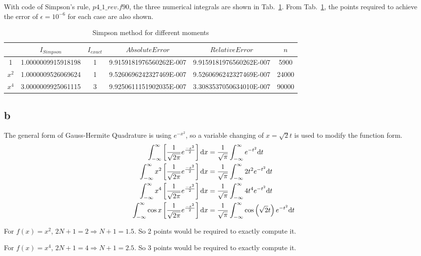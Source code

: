 \documentclass[letterpaper,10pt]{article}
\begin{document}
With code of Simpson's rule, $p4\_1\_{rev}.f90$, the three numerical integrals are shown in Tab.~\ref{tab4_1}. 
From Tab.~\ref{tab4_1}, the points required to achieve the error of $\epsilon=10^{-6}$ for each case are also shown. 
\begin{table}[htbp]
  \centering  
  \caption{Simpson method for different moments}\label{tab4_1}
  \begin{tabular}{cccccc}
    \hline
    & $I_{Simpson}$ & $I_{exact}$ & $Absolute Error$ & $Relative Error$& $n$\\
    \hline
    1 & 1.0000009915918198 & 1 & 9.9159181976560262E-007 & 9.9159181976560262E-007 & 5900\\
    $x^2$ & 1.0000009526069624 & 1 & 9.5260696242327469E-007 & 9.5260696242327469E-007 & 24000\\
    $x^4$ & 3.0000009925061115 & 3 & 9.9250611151902035E-007 & 3.3083537050634010E-007 & 90000\\
    \hline
  \end{tabular}
\end{table}
\subsection{b}
The general form of Gauss-Hermite Quadrature is using $e^{-x^2}$, so a variable changing of $x=\sqrt{2}t$ 
is used to modify the function form. 
\begin{align}
  \int_{-\infty}^{\infty} \left[\frac{1}{\sqrt{2\pi}}e^{\frac{-x^2}{2}}\right]\mathrm{d}x &= \frac{1}{\sqrt{\pi}}\int_{-\infty}^{\infty} e^{-t^2}\mathrm{d}t\notag\\
  \int_{-\infty}^{\infty} x^2\left[\frac{1}{\sqrt{2\pi}}e^{\frac{-x^2}{2}}\right]\mathrm{d}x &= \frac{1}{\sqrt{\pi}}\int_{-\infty}^{\infty} 2t^2 e^{-t^2}\mathrm{d}t\notag\\
  \int_{-\infty}^{\infty} x^4\left[\frac{1}{\sqrt{2\pi}}e^{\frac{-x^2}{2}}\right]\mathrm{d}x &= \frac{1}{\sqrt{\pi}}\int_{-\infty}^{\infty} 4t^4 e^{-t^2}\mathrm{d}t\notag\\
  \int_{-\infty}^{\infty} \cos x \left[\frac{1}{\sqrt{2\pi}}e^{\frac{-x^2}{2}}\right]\mathrm{d}x &= \frac{1}{\sqrt{\pi}}\int_{-\infty}^{\infty} \cos \left(\sqrt{2}t\right) e^{-t^2}\mathrm{d}t\notag
\end{align}

For $f\left(x\right)=x^2$, $2N+1=2 \Rightarrow N+1=1.5$. So 2 points would be required to exactly compute it. 

For $f\left(x\right)=x^4$, $2N+1=4 \Rightarrow N+1=2.5$. So 3 points would be required to exactly compute it. 
\end{document}
